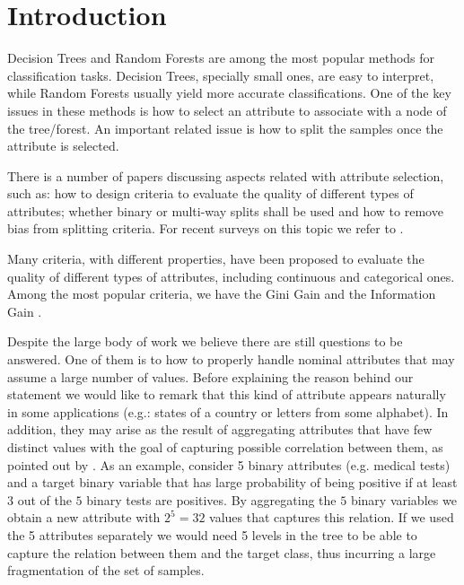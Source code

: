 \newpage

\chapter{Introduction}
\label{chap:introduction}

Decision Trees and Random Forests are among the most popular 
methods for classification tasks. Decision Trees, specially small ones, are easy to interpret,
while Random Forests usually yield more accurate classifications. One of the key issues in these methods
is how to select an attribute to associate with a node of the tree/forest. An important
related issue is how to split the samples once the attribute is selected.

There is a number of papers  discussing aspects related with 
attribute selection, such as:
how to design criteria to evaluate the quality of different types of attributes;
whether binary or multi-way splits shall be used and
how to remove bias from  splitting criteria.
For recent surveys on this topic we refer to \cite{books/sp/datamining2005/RokachM05,
Loh2014,series/sbcs/BarrosCF15}.

Many criteria, with different properties,  have been proposed to evaluate 
the quality of different types of attributes, including
continuous and categorical ones.  Among the most popular criteria,
we have the Gini Gain and the Information Gain \cite{}.

Despite the large body of work we believe  there are still questions to be answered.
One of them is to how to  properly handle nominal  attributes that may assume a large number of values.
Before explaining the reason behind our  statement we would
like to remark that this kind of attribute
appears naturally in some applications  (e.g.: states of a country or letters from some alphabet).
In addition, they may arise as the result of aggregating
attributes that have few distinct values
with the goal of capturing possible correlation between them, as pointed out by \cite{Chou:91}.
As an example, consider 5 binary attributes (e.g. medical tests) and a
target binary variable  that has large probability of being positive if at least $3$ out
of the $5$ binary tests are positives. By aggregating
the $5$ binary variables we obtain a new attribute with $2^5=32$
values that  captures  this relation. 
If we used the 5 attributes separately we would 
need 5 levels in the tree to be able to capture the relation between
them and the target class, thus 
incurring a large fragmentation of the set of samples.

